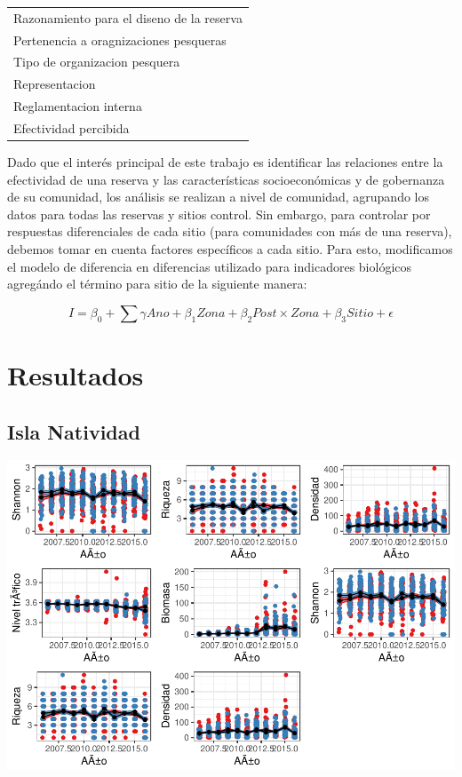 \documentclass[12pt,]{article}
\begin{document}
\begin{table}
\begin{tabular}[t]{l}
\hspace{1em}Razonamiento para el diseno de la reserva\\
\hspace{1em}Pertenencia a oragnizaciones pesqueras\\
\hspace{1em}Tipo de organizacion pesquera\\
\addlinespace
\hspace{1em}Representacion\\
\hspace{1em}Reglamentacion interna\\
\hspace{1em}Efectividad percibida\\
\bottomrule
\end{tabular}
\end{table}

Dado que el interés principal de este trabajo es identificar las
relaciones entre la efectividad de una reserva y las características
socioeconómicas y de gobernanza de su comunidad, los análisis se
realizan a nivel de comunidad, agrupando los datos para todas las
reservas y sitios control. Sin embargo, para controlar por respuestas
diferenciales de cada sitio (para comunidades con más de una reserva),
debemos tomar en cuenta factores específicos a cada sitio. Para esto,
modificamos el modelo de diferencia en diferencias utilizado para
indicadores biológicos agregándo el término para sitio de la siguiente
manera:

\[I = \beta_0 + \sum \gamma Ano + \beta_1 Zona + \beta_2 Post\times Zona + \beta_3Sitio + \epsilon\]

\section{Resultados}\label{resultados}

\subsection{Isla Natividad}\label{isla-natividad}

\includegraphics{Manuscript_files/figure-latex/unnamed-chunk-7-1.pdf}
\end{document}
